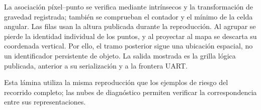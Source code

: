 La asociación píxel--punto se verifica mediante intrínsecos y la transformación de gravedad
registrada; también se comprueban el contador y el mínimo de la celda angular. Las filas usan
la altura publicada durante la reproducción. Al agrupar se pierde la identidad individual de
los puntos, y al proyectar al mapa se descarta su coordenada vertical. Por ello, el tramo
posterior sigue una ubicación espacial, no un identificador persistente de objeto. La salida
mostrada es la grilla lógica publicada, anterior a su serialización y a la frontera UART.

Esta lámina utiliza la misma reproducción que los ejemplos de riesgo del recorrido completo;
las nubes de diagnóstico permiten verificar la correspondencia entre sus representaciones.
